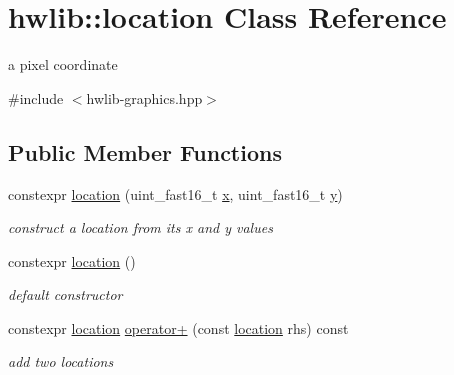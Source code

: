 \hypertarget{classhwlib_1_1location}{}\section{hwlib\+:\+:location Class Reference}
\label{classhwlib_1_1location}


a pixel coordinate  




{\ttfamily \#include $<$hwlib-\/graphics.\+hpp$>$}

\subsection*{Public Member Functions}
\begin{DoxyCompactItemize}
\item 
\mbox{\label{classhwlib_1_1location_ace4b0509b831483dcb62387c2678902b}} 
constexpr \hyperlink{classhwlib_1_1location_ace4b0509b831483dcb62387c2678902b}{location} (uint\+\_\+fast16\+\_\+t \hyperlink{classhwlib_1_1location_ac55b8b176b07e8520699e417149c79d6}{x}, uint\+\_\+fast16\+\_\+t \hyperlink{classhwlib_1_1location_a5e29ae3b19fd02b792dd79cec47f2cc3}{y})
\begin{DoxyCompactList}\small\item\em construct a location from its x and y values \end{DoxyCompactList}\item 
\mbox{\label{classhwlib_1_1location_a3db1eacc967cbd12c0ed52c69682880f}} 
constexpr \hyperlink{classhwlib_1_1location_a3db1eacc967cbd12c0ed52c69682880f}{location} ()
\begin{DoxyCompactList}\small\item\em default constructor \end{DoxyCompactList}\item 
\mbox{\label{classhwlib_1_1location_a68716bbcc1cddec3810bad5ef2dcaab8}} 
constexpr \hyperlink{classhwlib_1_1location}{location} \hyperlink{classhwlib_1_1location_a68716bbcc1cddec3810bad5ef2dcaab8}{operator+} (const \hyperlink{classhwlib_1_1location}{location} rhs) const
\begin{DoxyCompactList}\small\item\em add two locations \end{DoxyCompactList}\item 

\end{DoxyCompactItemize}
